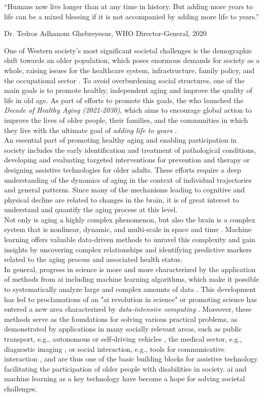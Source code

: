 \setlength{\epigraphwidth}{0.6\textwidth}
\epigraph{\centering “Humans now live longer than at any time in history. But adding more years to life can be a mixed blessing if it is not accompanied by adding more life to years.”} {Dr. Tedros Adhanom Ghebreyesus, WHO Director-General, 2020}

One of Western society's most significant societal challenges is the demographic shift towards an older population, which poses enormous demands for society as a whole, raising issues for the healthcare system, infrastructure, family policy, and the occupational sector \cite{who_aging2023}. To avoid overburdening social structures, one of the main goals is to promote healthy, independent aging and improve the quality of life in old age. As part of efforts to promote this goals, the \gls{who} launched the \textit{Decade of Healthy Aging (2021-2030)}, which aims to encourage global action to improve the lives of older people, their families, and the communities in which they live with the ultimate goal of \textit{adding life to years} \cite{who_aging2023}.\\
An essential part of promoting healthy aging and enabling participation in society includes  the early identification and treatment of pathological conditions, developing and evaluating targeted interventions for prevention and therapy or designing assistive technologies for older adults. These efforts require a deep understanding of the dynamics of aging in the context of individual trajectories and general patterns. Since many of the mechanisms leading to cognitive and physical decline are related to changes in the brain, it is of great interest to understand and quantify the aging process at this level.\\
Not only is aging a highly complex phenomenon, but also the brain is a complex system that is nonlinear, dynamic, and multi-scale in space and time \cite{Betzel2017}. Machine learning offers valuable data-driven methods to unravel this complexity and gain insights by uncovering complex relationships and identifying predictive markers related to the aging process and associated health status.\\
In general, progress in science is more and more characterized by the application of methods from \gls{ai} including machine learning algorithms, which make it possible to systematically analyze large and complex amounts of data \cite{Brunton2019}. This development has led to proclamations of an "\gls{ai} revolution in science" \cite{Appenzeller2017} or promoting science has entered a new area characterized by \textit{data-intensive computing} \cite{Hey2009}. Moreover, these methods serve as the foundations for solving various practical problems, as demonstrated by applications in many socially relevant areas, such as public transport, e.g., autonomous or self-driving vehicles \cite{Leonard2020}, the medical sector, e.g., diagnostic imaging \cite{Liu2020}, or social interaction, e.g., tools for communicative interaction \cite{Adamopoulou2020}, and are thus one of the basic building blocks for assistive technology facilitating the participation of older people with disabilities in society. \Gls{ai} and machine learning as a key technology have become a hope for solving societal challenges.\\
